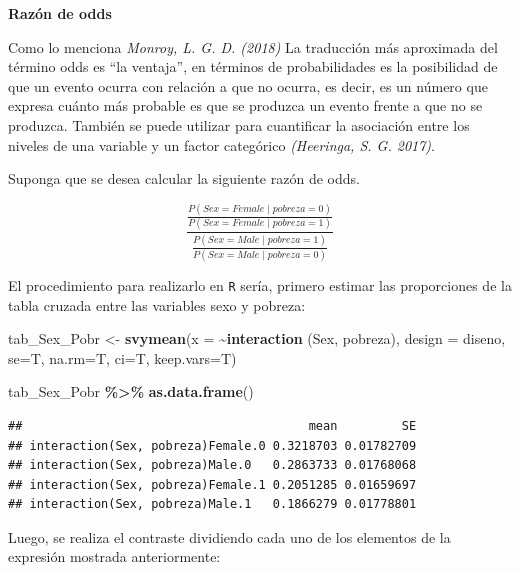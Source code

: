 \documentclass[
  12pt,
]{book}
\newenvironment{Shaded}{\begin{snugshade}}{\end{snugshade}}
\newcommand{\AttributeTok}[1]{\textcolor[rgb]{0.13,0.29,0.53}{#1}}
\newcommand{\FunctionTok}[1]{\textcolor[rgb]{0.13,0.29,0.53}{\textbf{#1}}}
\newcommand{\NormalTok}[1]{#1}
\newcommand{\OtherTok}[1]{\textcolor[rgb]{0.56,0.35,0.01}{#1}}
\newcommand{\SpecialCharTok}[1]{\textcolor[rgb]{0.81,0.36,0.00}{\textbf{#1}}}
\begin{document}
\textbf{Razón de odds}

Como lo menciona \emph{Monroy, L. G. D. (2018)} La traducción más aproximada del término odds es ``la ventaja'', en términos de probabilidades es la posibilidad de que un evento ocurra con relación a que no ocurra, es decir, es un número que expresa cuánto más probable es que se produzca un evento frente a que no se produzca. También se puede utilizar para cuantificar la asociación entre los niveles de una variable y un factor categórico \emph{(Heeringa, S. G. 2017)}.

Suponga que se desea calcular la siguiente razón de odds.

\[
 \frac{\frac{P(Sex = Female \mid pobreza = 0 )}{P(Sex = Female \mid pobreza = 1 )}}{
 \frac{P(Sex = Male \mid pobreza = 1 )}{P(Sex = Male \mid pobreza = 0 )}
 }
\]

El procedimiento para realizarlo en \texttt{R} sería, primero estimar las proporciones de la tabla cruzada entre las variables sexo y pobreza:

\begin{Shaded}
\begin{Highlighting}[]
\NormalTok{tab\_Sex\_Pobr }\OtherTok{\textless{}{-}} \FunctionTok{svymean}\NormalTok{(}\AttributeTok{x =} \SpecialCharTok{\textasciitilde{}}\FunctionTok{interaction}\NormalTok{ (Sex, pobreza), }\AttributeTok{design =}\NormalTok{ diseno, }
                        \AttributeTok{se=}\NormalTok{T, }\AttributeTok{na.rm=}\NormalTok{T, }\AttributeTok{ci=}\NormalTok{T, }\AttributeTok{keep.vars=}\NormalTok{T)}

\NormalTok{tab\_Sex\_Pobr }\SpecialCharTok{\%\textgreater{}\%}  \FunctionTok{as.data.frame}\NormalTok{()}
\end{Highlighting}
\end{Shaded}

\begin{verbatim}
##                                        mean         SE
## interaction(Sex, pobreza)Female.0 0.3218703 0.01782709
## interaction(Sex, pobreza)Male.0   0.2863733 0.01768068
## interaction(Sex, pobreza)Female.1 0.2051285 0.01659697
## interaction(Sex, pobreza)Male.1   0.1866279 0.01778801
\end{verbatim}

Luego, se realiza el contraste dividiendo cada uno de los elementos de la expresión mostrada anteriormente:
\end{document}
